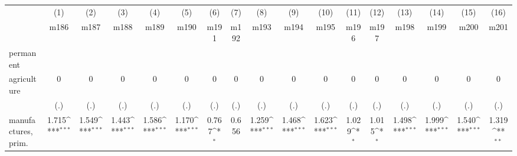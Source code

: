 {
\def\sym#1{\ifmmode^{#1}\else\(^{#1}\)\fi}
\begin{tabular}{l*{16}{c}}
\hline\hline
                    &\multicolumn{1}{c}{(1)}&\multicolumn{1}{c}{(2)}&\multicolumn{1}{c}{(3)}&\multicolumn{1}{c}{(4)}&\multicolumn{1}{c}{(5)}&\multicolumn{1}{c}{(6)}&\multicolumn{1}{c}{(7)}&\multicolumn{1}{c}{(8)}&\multicolumn{1}{c}{(9)}&\multicolumn{1}{c}{(10)}&\multicolumn{1}{c}{(11)}&\multicolumn{1}{c}{(12)}&\multicolumn{1}{c}{(13)}&\multicolumn{1}{c}{(14)}&\multicolumn{1}{c}{(15)}&\multicolumn{1}{c}{(16)}\\
                    &\multicolumn{1}{c}{m186}&\multicolumn{1}{c}{m187}&\multicolumn{1}{c}{m188}&\multicolumn{1}{c}{m189}&\multicolumn{1}{c}{m190}&\multicolumn{1}{c}{m191}&\multicolumn{1}{c}{m192}&\multicolumn{1}{c}{m193}&\multicolumn{1}{c}{m194}&\multicolumn{1}{c}{m195}&\multicolumn{1}{c}{m196}&\multicolumn{1}{c}{m197}&\multicolumn{1}{c}{m198}&\multicolumn{1}{c}{m199}&\multicolumn{1}{c}{m200}&\multicolumn{1}{c}{m201}\\
\hline
permanent           &                     &                     &                     &                     &                     &                     &                     &                     &                     &                     &                     &                     &                     &                     &                     &                     \\
agriculture         &           0         &           0         &           0         &           0         &           0         &           0         &           0         &           0         &           0         &           0         &           0         &           0         &           0         &           0         &           0         &           0         \\
                    &         (.)         &         (.)         &         (.)         &         (.)         &         (.)         &         (.)         &         (.)         &         (.)         &         (.)         &         (.)         &         (.)         &         (.)         &         (.)         &         (.)         &         (.)         &         (.)         \\
[1em]
manufactures, prim. &       1.715\sym{***}&       1.549\sym{***}&       1.443\sym{***}&       1.586\sym{***}&       1.170\sym{***}&       0.767\sym{*}  &       0.656         &       1.259\sym{***}&       1.468\sym{***}&       1.623\sym{***}&       1.029\sym{*}  &       1.015\sym{*}  &       1.498\sym{***}&       1.999\sym{***}&       1.540\sym{***}&       1.319\sym{**} \\

\end{tabular}}
